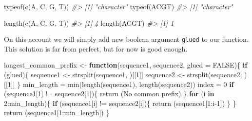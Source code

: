 \documentclass[
]{book}
\newenvironment{Shaded}{\begin{snugshade}}{\end{snugshade}}
\newcommand{\AttributeTok}[1]{\textcolor[rgb]{0.77,0.63,0.00}{#1}}
\newcommand{\CommentTok}[1]{\textcolor[rgb]{0.56,0.35,0.01}{\textit{#1}}}
\newcommand{\ConstantTok}[1]{\textcolor[rgb]{0.00,0.00,0.00}{#1}}
\newcommand{\ControlFlowTok}[1]{\textcolor[rgb]{0.13,0.29,0.53}{\textbf{#1}}}
\newcommand{\DecValTok}[1]{\textcolor[rgb]{0.00,0.00,0.81}{#1}}
\newcommand{\FunctionTok}[1]{\textcolor[rgb]{0.00,0.00,0.00}{#1}}
\newcommand{\NormalTok}[1]{#1}
\newcommand{\OtherTok}[1]{\textcolor[rgb]{0.56,0.35,0.01}{#1}}
\newcommand{\SpecialCharTok}[1]{\textcolor[rgb]{0.00,0.00,0.00}{#1}}
\newcommand{\StringTok}[1]{\textcolor[rgb]{0.31,0.60,0.02}{#1}}
\begin{document}
\begin{Shaded}
\begin{Highlighting}[]
\FunctionTok{typeof}\NormalTok{(}\FunctionTok{c}\NormalTok{(}\StringTok{\textquotesingle{}A\textquotesingle{}}\NormalTok{, }\StringTok{\textquotesingle{}C\textquotesingle{}}\NormalTok{, }\StringTok{\textquotesingle{}G\textquotesingle{}}\NormalTok{, }\StringTok{\textquotesingle{}T\textquotesingle{}}\NormalTok{))}
\CommentTok{\#\textgreater{} [1] "character"}
\FunctionTok{typeof}\NormalTok{(}\StringTok{\textquotesingle{}ACGT\textquotesingle{}}\NormalTok{)}
\CommentTok{\#\textgreater{} [1] "character"}

\FunctionTok{length}\NormalTok{(}\FunctionTok{c}\NormalTok{(}\StringTok{\textquotesingle{}A\textquotesingle{}}\NormalTok{, }\StringTok{\textquotesingle{}C\textquotesingle{}}\NormalTok{, }\StringTok{\textquotesingle{}G\textquotesingle{}}\NormalTok{, }\StringTok{\textquotesingle{}T\textquotesingle{}}\NormalTok{))}
\CommentTok{\#\textgreater{} [1] 4}
\FunctionTok{length}\NormalTok{(}\StringTok{\textquotesingle{}ACGT\textquotesingle{}}\NormalTok{)}
\CommentTok{\#\textgreater{} [1] 1}
\end{Highlighting}
\end{Shaded}

On this account we will simply add new boolean argument \texttt{glued} to our function. This solution is far from perfect, but for now is good enough.

\begin{Shaded}
\begin{Highlighting}[]
\NormalTok{longest\_common\_prefix }\OtherTok{\textless{}{-}} \ControlFlowTok{function}\NormalTok{(sequence1, sequence2, }\AttributeTok{glued =} \ConstantTok{FALSE}\NormalTok{)\{}
  \ControlFlowTok{if}\NormalTok{ (glued)\{}
\NormalTok{    sequence1 }\OtherTok{\textless{}{-}} \FunctionTok{strsplit}\NormalTok{(sequence1, }\StringTok{\textquotesingle{}\textquotesingle{}}\NormalTok{)[[}\DecValTok{1}\NormalTok{]]}
\NormalTok{    sequence2 }\OtherTok{\textless{}{-}} \FunctionTok{strsplit}\NormalTok{(sequence2, }\StringTok{\textquotesingle{}\textquotesingle{}}\NormalTok{)[[}\DecValTok{1}\NormalTok{]]}
\NormalTok{  \}}
\NormalTok{  min\_length }\OtherTok{=} \FunctionTok{min}\NormalTok{(}\FunctionTok{length}\NormalTok{(sequence1), }\FunctionTok{length}\NormalTok{(sequence2))}
\NormalTok{  index }\OtherTok{=} \DecValTok{0}
  \ControlFlowTok{if}\NormalTok{ (sequence1[}\DecValTok{1}\NormalTok{] }\SpecialCharTok{!=}\NormalTok{ sequence2[}\DecValTok{1}\NormalTok{])\{}
    \FunctionTok{return}\NormalTok{ (}\StringTok{\textquotesingle{}No common prefix\textquotesingle{}}\NormalTok{)}
\NormalTok{  \}}
  \ControlFlowTok{for}\NormalTok{ (i }\ControlFlowTok{in} \DecValTok{2}\SpecialCharTok{:}\NormalTok{min\_length)\{}
    \ControlFlowTok{if}\NormalTok{ (sequence1[i] }\SpecialCharTok{!=}\NormalTok{ sequence2[i])\{}
      \FunctionTok{return}\NormalTok{ (sequence1[}\DecValTok{1}\SpecialCharTok{:}\NormalTok{i}\DecValTok{{-}1}\NormalTok{])}
\NormalTok{    \}}
\NormalTok{  \}}
  \FunctionTok{return}\NormalTok{ (sequence1[}\DecValTok{1}\SpecialCharTok{:}\NormalTok{min\_length])}
\NormalTok{\}}
\end{Highlighting}
\end{Shaded}
\end{document}
